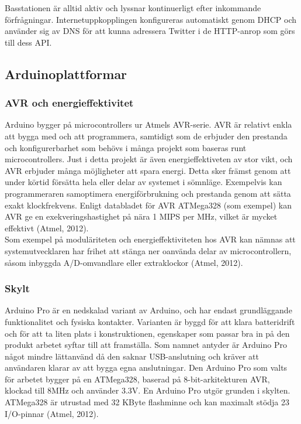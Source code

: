 \documentclass[a4paper,11pt]{article}
\begin{document}
Basstationen är alltid aktiv och lyssnar kontinuerligt efter inkommande förfrågningar. Internetuppkopplingen konfigureras automatiskt genom DHCP och använder sig av DNS för att kunna adressera Twitter i de HTTP-anrop som görs till dess API.

\subsection{Arduinoplattformar}

\subsubsection{AVR och energieffektivitet}
Arduino bygger på microcontrollers ur Atmels AVR-serie. AVR är relativt enkla att bygga med och att programmera, samtidigt som de erbjuder den prestanda och konfigurerbarhet som behövs i många projekt som baseras runt microcontrollers. Just i detta projekt är även energieffektiveten av stor vikt, och AVR erbjuder många möjligheter att spara energi. Detta sker främst genom att under körtid försätta hela eller delar av systemet i sömnläge. Exempelvis kan programmeraren samoptimera energiförbrukning och prestanda genom att sätta exakt klockfrekvens. Enligt databladet för AVR ATMega328 (som exempel) kan AVR ge en exekveringshastighet på nära 1 MIPS per MHz, vilket är mycket effektivt (Atmel, 2012). \\

Som exempel på moduläriteten och energieffektiviteten hos AVR kan nämnas att systemutvecklaren har frihet att stänga ner oanvända delar av microcontrollern, såsom inbyggda A/D-omvandlare eller extraklockor (Atmel, 2012).

\subsubsection{Skylt}
Arduino Pro är en nedskalad variant av Arduino, och har endast grundläggande funktionalitet och fysiska kontakter. Varianten är byggd för att klara batteridrift och för att ta liten plats i konstruktionen, egenskaper som passar bra in på den produkt arbetet syftar till att framställa. Som namnet antyder är Arduino Pro något mindre lättanvänd då den saknar USB-anslutning och kräver att användaren klarar av att bygga egna anslutningar. Den Arduino Pro som valts för arbetet bygger på en ATMega328, baserad på 8-bit-arkitekturen AVR, klockad till 8MHz och använder 3.3V. En Arduino Pro utgör grunden i skylten. ATMega328 är utrustad med 32 KByte flashminne och kan maximalt stödja 23 I/O-pinnar (Atmel, 2012).
\end{document}
